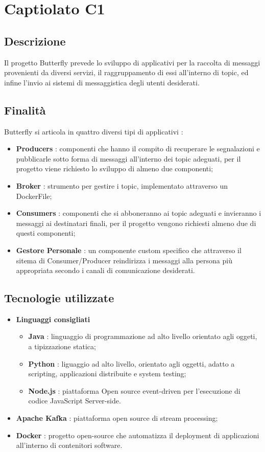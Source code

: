 \section{Captiolato C1}
	\subsection{Descrizione}
		Il progetto Butterfly prevede lo sviluppo di applicativi per la raccolta di messaggi provenienti da diversi servizi, il raggruppamento di essi all'interno di topic, ed infine l'invio ai sistemi di messaggistica degli utenti desiderati.
	\subsection{Finalità}
		Butterfly si articola in quattro diversi tipi di applicativi :
		\begin{itemize}
			\item \textbf{Producers} : componenti che hanno il compito di recuperare le segnalazioni e pubblicarle sotto forma di messaggi all'interno dei topic adeguati, per il progetto viene richiesto lo sviluppo di almeno due componenti;
			\item \textbf{Broker} : strumento per gestire i topic, implementato attraverso un DockerFile;
			\item \textbf{Consumers} : componenti che si abboneranno ai topic adeguati e invieranno i messaggi ai destinatari finali, per il progetto vengono richiesti almeno due di questi componenti;
			\item \textbf{Gestore Personale} : un componente custom specifico che attraverso il sitema di Consumer/Producer reindirizza i messaggi alla persona più appropriata secondo i canali di comunicazione desiderati.
		\end{itemize}
	\subsection{Tecnologie utilizzate}
		\begin{itemize}
			\item \textbf{Linguaggi consigliati}
				\begin{itemize}
					\item \textbf{Java} : linguaggio di programmazione ad alto livello orientato agli oggeti, a tipizzazione statica;
					\item \textbf{Python} : liguaggio ad alto livello, orientato agli oggetti, adatto a scripting, applicazioni distribuite e system testing;
					\item \textbf{Node.js} : piattaforma Open source event-driven per l'esecuzione di codice JavaScript Server-side.
				\end{itemize}
			\item \textbf{Apache Kafka} : piattaforma open source di stream processing;
			\item \textbf{Docker} : progetto open-source che automatizza il deployment di applicazioni all'interno di contenitori software.
		\end{itemize}
